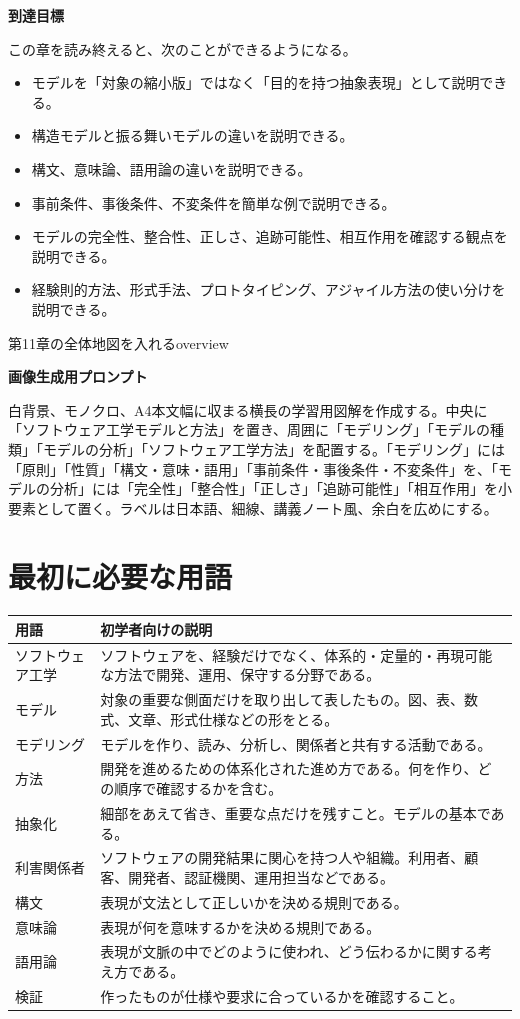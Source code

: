 \documentclass[a4paper,11pt]{ltjsarticle}
\newcommand{\prompt}[1]{\par\noindent\textbf{画像生成用プロンプト}\par\small #1\normalsize}
\begin{document}
\noindent\textbf{到達目標}\par
この章を読み終えると、次のことができるようになる。
\begin{itemize}
  \item モデルを「対象の縮小版」ではなく「目的を持つ抽象表現」として説明できる。
  \item 構造モデルと振る舞いモデルの違いを説明できる。
  \item 構文、意味論、語用論の違いを説明できる。
  \item 事前条件、事後条件、不変条件を簡単な例で説明できる。
  \item モデルの完全性、整合性、正しさ、追跡可能性、相互作用を確認する観点を説明できる。
  \item 経験則的方法、形式手法、プロトタイピング、アジャイル方法の使い分けを説明できる。
\end{itemize}

\begin{todobox}{第11章の全体地図を入れる}{overview}
\prompt{白背景、モノクロ、A4本文幅に収まる横長の学習用図解を作成する。中央に「ソフトウェア工学モデルと方法」を置き、周囲に「モデリング」「モデルの種類」「モデルの分析」「ソフトウェア工学方法」を配置する。「モデリング」には「原則」「性質」「構文・意味・語用」「事前条件・事後条件・不変条件」を、「モデルの分析」には「完全性」「整合性」「正しさ」「追跡可能性」「相互作用」を小要素として置く。ラベルは日本語、細線、講義ノート風、余白を広めにする。}
\end{todobox}

\section*{最初に必要な用語}
\begin{longtable}{>{\raggedright\arraybackslash}p{}>{\raggedright\arraybackslash}p{}}
\toprule
\textbf{用語} & \textbf{初学者向けの説明} \\
\midrule
ソフトウェア工学 & ソフトウェアを、経験だけでなく、体系的・定量的・再現可能な方法で開発、運用、保守する分野である。\\
モデル & 対象の重要な側面だけを取り出して表したもの。図、表、数式、文章、形式仕様などの形をとる。\\
モデリング & モデルを作り、読み、分析し、関係者と共有する活動である。\\
方法 & 開発を進めるための体系化された進め方である。何を作り、どの順序で確認するかを含む。\\
抽象化 & 細部をあえて省き、重要な点だけを残すこと。モデルの基本である。\\
利害関係者 & ソフトウェアの開発結果に関心を持つ人や組織。利用者、顧客、開発者、認証機関、運用担当などである。\\
構文 & 表現が文法として正しいかを決める規則である。\\
意味論 & 表現が何を意味するかを決める規則である。\\
語用論 & 表現が文脈の中でどのように使われ、どう伝わるかに関する考え方である。\\
検証 & 作ったものが仕様や要求に合っているかを確認すること。\\
\bottomrule
\end{longtable}
\end{document}
